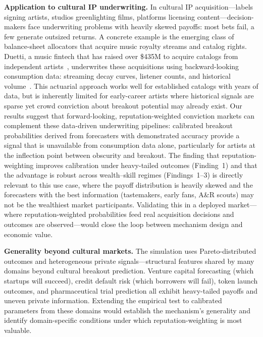 \documentclass[conference]{IEEEtran}
\begin{document}
\textbf{Application to cultural IP underwriting.} In cultural IP acquisition---labels signing artists, studios greenlighting films, platforms licensing content---decision-makers face underwriting problems with heavily skewed payoffs: most bets fail, a few generate outsized returns. A concrete example is the emerging class of balance-sheet allocators that acquire music royalty streams and catalog rights. Duetti, a music fintech that has raised over \$435M to acquire catalogs from independent artists~\cite{duetti2025}, underwrites these acquisitions using backward-looking consumption data: streaming decay curves, listener counts, and historical volume~\cite{cohencircle2024}. This actuarial approach works well for established catalogs with years of data, but is inherently limited for early-career artists where historical signals are sparse yet crowd conviction about breakout potential may already exist. Our results suggest that forward-looking, reputation-weighted conviction markets can complement these data-driven underwriting pipelines: calibrated breakout probabilities derived from forecasters with demonstrated accuracy provide a signal that is unavailable from consumption data alone, particularly for artists at the inflection point between obscurity and breakout. The finding that reputation-weighting improves calibration under heavy-tailed outcomes (Finding~1) and that the advantage is robust across wealth--skill regimes (Findings~1--3) is directly relevant to this use case, where the payoff distribution is heavily skewed and the forecasters with the best information (tastemakers, early fans, A\&R scouts) may not be the wealthiest market participants. Validating this in a deployed market---where reputation-weighted probabilities feed real acquisition decisions and outcomes are observed---would close the loop between mechanism design and economic value.

\textbf{Generality beyond cultural markets.} The simulation uses Pareto-distributed outcomes and heterogeneous private signals---structural features shared by many domains beyond cultural breakout prediction. Venture capital forecasting (which startups will succeed), credit default risk (which borrowers will fail), token launch outcomes, and pharmaceutical trial prediction all exhibit heavy-tailed payoffs and uneven private information. Extending the empirical test to calibrated parameters from these domains would establish the mechanism's generality and identify domain-specific conditions under which reputation-weighting is most valuable.
\end{document}
